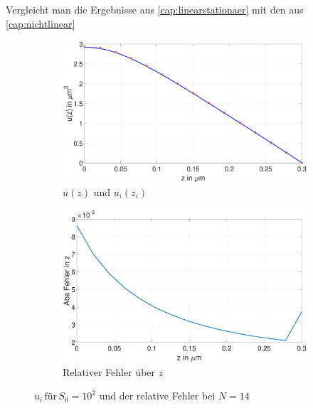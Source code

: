 Vergleicht man die Ergebnisse aus \cref{cap:linearstationaer} mit den aus \cref{cap:nichtlinear}   
\begin{figure}[h]
	\begin{subfigure}[b]{0.5\textwidth}
		\includegraphics[width=\textwidth]{figures/station_gl_2_2/S0}
		\caption{$u(z)$ und $u_{i}(z_i)$}
	\end{subfigure}
	\hfill
	\begin{subfigure}[b]{0.5\textwidth}
		\includegraphics[width=1\linewidth]{figures/station_gl_2_2/S0_fehler}
		\caption{Relativer Fehler über $z$}
	\end{subfigure}
	\caption{$u_i \,\text{für} \, S_0=10^2$ und der relative Fehler bei $N=14$ }
\end{figure}

